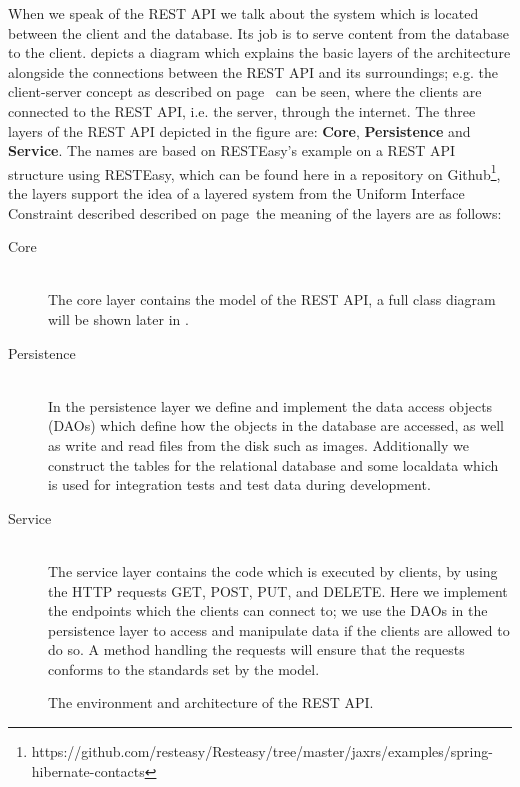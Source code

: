 When we speak of the REST API we talk about the system which is located between the client and the database.
Its job is to serve content from the database to the client.
 depicts a diagram which explains the basic layers of the architecture alongside the connections between the REST API and its surroundings; e.g. the client-server concept as described on page~\pageref{client-server-rest} can be seen, where the clients are connected to the REST API, i.e. the server, through the internet.
The three layers of the REST API depicted in the figure are: \textbf{Core}, \textbf{Persistence} and \textbf{Service}.
The names are based on RESTEasy's example on a REST API structure using RESTEasy, which can be found here in a repository on Github\footnote{https://github.com/resteasy/Resteasy/tree/master/jaxrs/examples/spring-hibernate-contacts}, the layers support the idea of a layered system from the Uniform Interface Constraint described described on page~\pageref{layeredsystem}the meaning of the layers are as follows:
\begin{description}
    \item[Core] \hfill \\
    The core layer contains the model of the REST API, a full class diagram will be shown later in .

    \item[Persistence] \hfill \\
    In the persistence layer we define and implement the data access objects (DAOs) which define how the objects in the database are accessed, as well as write and read files from the disk such as images.
    Additionally we construct the tables for the relational database and some localdata which is used for integration tests and test data during development.

    \item[Service] \hfill \\
    The service layer contains the code which is executed by clients, by using the HTTP requests GET, POST, PUT, and DELETE.
    Here we implement the endpoints which the clients can connect to; we use the DAOs in the persistence layer to access and manipulate data if the clients are allowed to do so. 
    A method handling the requests will ensure that the requests conforms to the standards set by the model.
\end{description}

\begin{figure}[h]
    \centering
    
    \caption{The environment and architecture of the REST API.}\label{fig:rest-architecture}
\end{figure}

